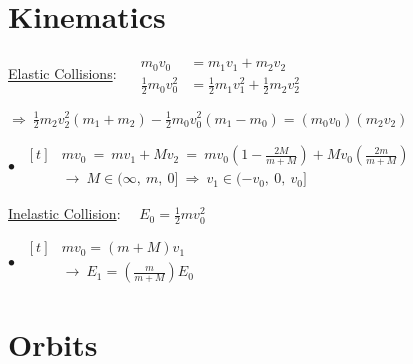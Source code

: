 \documentclass[12pt]{article}
\begin{document}
\section{Kinematics}
\begin{minipage}[t]{.6\textwidth}
    \underline{Elastic Collisions}: \ \ \(
        \begin{aligned}
            m_0 v_0 &= m_1 v_1 + m_2 v_2\\[5pt]
            \tfrac{1}{2} m_0 v_0^2 &= \tfrac{1}{2} m_1 v_1^2 + \tfrac{1}{2} m_2 v_2^2
        \end{aligned}  
    \)

    \vspace{7pt}
    \(\Rightarrow\ \boxed{ 
        \tfrac{1}{2} m_2 v_2^2 (m_1 + m_2) - \tfrac{1}{2} m_0 v_0^2 (m_1 - m_0) 
        = (m_0 v_0)(m_2 v_2) 
    }\)

    \vspace{10pt}\noindent
    \(
        \bullet\ \ \boxed{ \begin{aligned}[t]
            & m v_0 \ =\ m v_1 + M v_2 
                \ =\ 
                m v_0 \left( 1 - \tfrac{2M}{m+M} \right) + M v_0 \left( \tfrac{2m}{m + M} \right) 
                \\[5pt]
            & \rightarrow\
                M \in (\infty,\ m,\ 0] 
                \ \Rightarrow\ 
                v_1 \in (-v_0,\ 0,\ v_0]
        \end{aligned} }
    \)
\end{minipage}
\hfill
\begin{minipage}[t]{.35\textwidth}
    \underline{Inelastic Collision}: \ \ \(E_0 = \tfrac{1}{2} m v_0^2\)

    \vspace{7pt} 
    \(\bullet\ \ \boxed{ \begin{aligned}[t]
        & m v_0 = (m + M) v_1 \\[5pt]
        & \rightarrow\ E_1 = \left( \tfrac{m}{m+M} \right) E_0
    \end{aligned}} \)
\end{minipage}

\vspace{10pt}
\section{Orbits}
\end{document}
